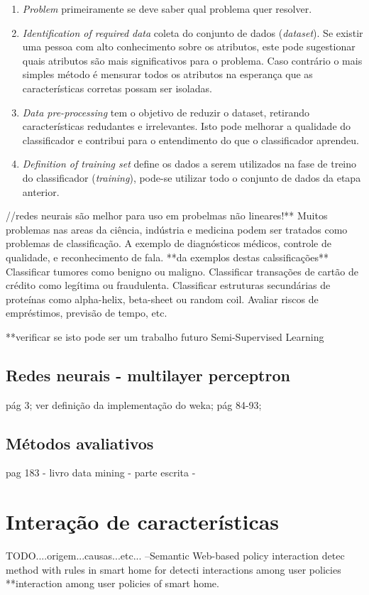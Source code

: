 \begin{enumerate}
\item \textit{Problem}\: primeiramente se deve saber qual problema quer resolver.
\item \textit{Identification of required data}\: coleta do conjunto de dados (\textit{dataset}). Se existir uma pessoa com alto conhecimento sobre os atributos, este pode sugestionar quais atributos são mais significativos para o problema. Caso contrário o mais simples método é mensurar todos os atributos na esperança que as características corretas possam ser isoladas.
\item \textit{Data pre-processing}\: tem o objetivo de reduzir o dataset, retirando características redudantes e irrelevantes. Isto pode melhorar a qualidade do classificador e contribui para o entendimento do que o classificador aprendeu.
\item \textit{Definition of training set}\: define os dados a serem utilizados na fase de treino do classificador (\textit{training}), pode-se utilizar todo o conjunto de dados da etapa anterior.
\end{enumerate}


//redes neurais são melhor para uso em probelmas não lineares!**
Muitos problemas nas areas da ciência, indústria e medicina podem ser tratados como problemas de classificação. A exemplo de diagnósticos médicos, controle de qualidade, e reconhecimento de fala\cite{Zhang:2000}. **da exemplos destas calssificações**
Classificar tumores como benigno ou maligno.
Classificar transações de cartão de 
crédito como legítima ou fraudulenta.
Classificar estruturas secundárias de 
proteínas como alpha-helix, beta-sheet ou random coil.
Avaliar riscos de empréstimos, 
previsão de tempo, etc.

**verificar se isto pode ser um trabalho futuro
Semi-Supervised Learning
\subsection{Redes neurais - multilayer perceptron}
pág 3;
ver definição da implementação do weka;
pág 84-93;

\subsection{Métodos avaliativos}
\cite{Witten:2005} pag 183 - livro data mining - parte escrita - 

\section{Interação de características}
TODO....origem...causas...etc...
--Semantic Web-based policy interaction detec method with rules in smart home for detecti interactions among user policies
**interaction among user policies of smart home.

